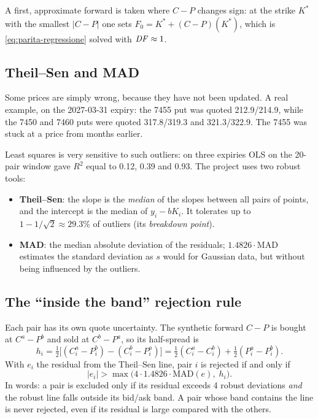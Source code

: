 A first, approximate forward is taken where $C-P$ changes sign: at the strike $K^*$ with the smallest $|C-P|$ one sets
$F_0=K^*+(C-P)(K^*)$, which is \eqref{eq:parita-regressione} solved with $\mathit{DF}\approx1$.

\subsection{Theil--Sen and MAD}
Some prices are simply wrong, because they have not been updated. A real example, on the \mbox{2027-03-31} expiry:
the 7455 put was quoted 212.9/214.9, while the 7450 and 7460 puts were quoted 317.8/319.3 and 321.3/322.9. The 7455
was stuck at a price from months earlier.

Least squares is very sensitive to such outliers: on three expiries OLS on the 20-pair window gave $R^2$ equal to
0.12, 0.39 and 0.93. The project uses two robust tools:
\begin{itemize}
\item \textbf{Theil--Sen}: the slope is the \emph{median} of the slopes between all pairs of points, and the
intercept is the median of $y_i-bK_i$. It tolerates up to $1-1/\sqrt2\approx29.3\%$ of outliers (its
\emph{breakdown point}).
\item \textbf{MAD}: the median absolute deviation of the residuals; $1.4826\cdot\mathrm{MAD}$ estimates the standard
deviation as $s$ would for Gaussian data, but without being influenced by the outliers.
\end{itemize}

\subsection{The ``inside the band'' rejection rule}
Each pair has its own quote uncertainty. The synthetic forward $C-P$ is bought at $C^a-P^b$ and sold at $C^b-P^a$,
so its half-spread is
\begin{equation}\label{eq:semiampiezza-cp}
h_i=\tfrac12\big[(C^a_i-P^b_i)-(C^b_i-P^a_i)\big]=\tfrac12(C^a_i-C^b_i)+\tfrac12(P^a_i-P^b_i).
\end{equation}
With $e_i$ the residual from the Theil--Sen line, pair $i$ is rejected if and only if
\begin{equation}\label{eq:regola-scarto}
|e_i|>\max\big(4\cdot1.4826\cdot\mathrm{MAD}(e),\;h_i\big).
\end{equation}
In words: a pair is excluded only if its residual exceeds 4 robust deviations \emph{and} the robust line falls
outside its bid/ask band. A pair whose band contains the line is never rejected, even if its residual is large
compared with the others.

